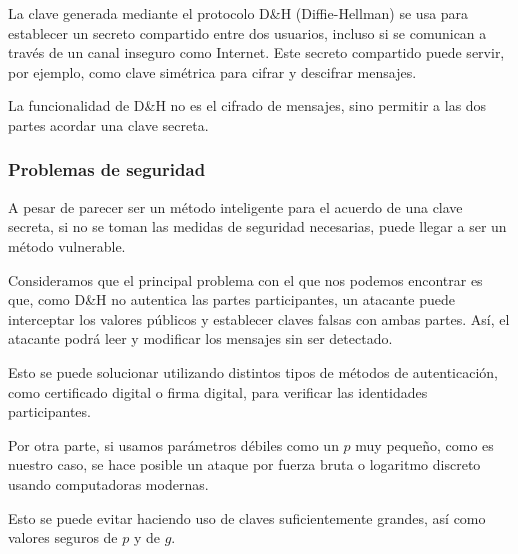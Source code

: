 La clave generada mediante el protocolo D\&H (Diffie-Hellman) se usa para establecer un secreto compartido entre dos usuarios, incluso si se comunican a través de un canal inseguro como Internet. Este secreto compartido puede servir, por ejemplo, como clave simétrica para cifrar y descifrar mensajes. 

La funcionalidad de D\&H no es el cifrado de mensajes, sino permitir a las dos partes acordar una clave secreta. 


\subsubsection{Problemas de seguridad}

A pesar de parecer ser un método inteligente para el acuerdo de una clave secreta, si no se toman las medidas de seguridad necesarias, puede llegar a ser un método vulnerable.  

Consideramos que el principal problema con el que nos podemos encontrar es que, como D\&H no autentica las partes participantes, un atacante puede interceptar los valores públicos y establecer claves falsas con ambas partes. Así, el atacante podrá leer y modificar los mensajes sin ser detectado. 

Esto se puede solucionar utilizando distintos tipos de métodos de autenticación, como certificado digital o firma digital, para verificar las identidades participantes. 

Por otra parte, si usamos parámetros débiles como un $p$ muy pequeño, como es nuestro caso, se hace posible un ataque por fuerza bruta o logaritmo discreto usando computadoras modernas. 

Esto se puede evitar haciendo uso de claves suficientemente grandes, así como valores seguros de $p$ y de $g$. 
